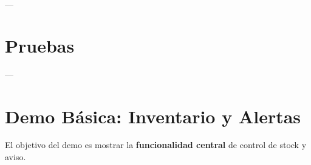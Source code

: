 \documentclass{article}
\begin{document}
	\begin{itemize}[label=$\bullet$]
	
	---
	
	\section{Pruebas}
	\begin{itemize}[label=$\bullet$]
	\end{itemize}
	
	---
	
	\section{Demo Básica: Inventario y Alertas}
	El objetivo del demo es mostrar la \textbf{funcionalidad central} de control de stock y aviso.
	

\end{itemize}
\end{document}

